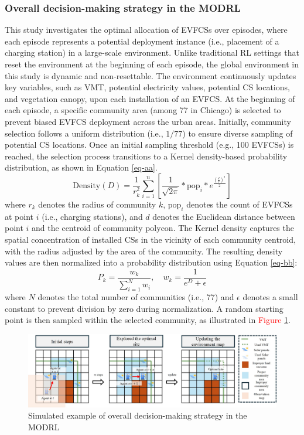 \documentclass[preprint,12pt]{elsarticle}
\begin{document}
\subsubsection{Overall decision-making strategy in the MODRL}
This study investigates the optimal allocation of EVFCSs over episodes, where each episode represents a potential deployment instance (i.e., placement of a charging station) in a large-scale environment. Unlike traditional RL settings that reset the environment at the beginning of each episode, the global environment in this study is dynamic and non-resettable. The environment continuously updates key variables, such as VMT, potential electricity values, potential CS locations, and vegetation canopy, upon each installation of an EVFCS. At the beginning of each episode, a specific community area (among 77 in Chicago) is selected to prevent biased EVFCS deployment across the urban areas. Initially, community selection follows a uniform distribution (i.e., $1/77$) to ensure diverse sampling of potential CS locations. Once an initial sampling threshold (e.g., 100 EVFCSs) is reached, the selection process transitions to a Kernel density-based probability distribution, as shown in Equation \eqref{eq-aa}.
\begin{equation} \label{eq-aa}
    \mathrm{Density}(D)=\frac{1}{r^2_k}\sum_{i=1}^{n}[\frac{1}{\sqrt{2\pi}}*\mathrm{pop}_i*e^{\frac{(\frac{d}{r})^2}{2}}]
\end{equation}
where $r_k$ denotes the radius of community $k$, $\mathrm{pop}_i$ denotes the count of EVFCSs at point $i$ (i.e., charging stations), and $d$ denotes the Euclidean distance between point $i$ and the centroid of community polycon. The Kernel density captures the spatial concentration of installed CSs in the vicinity of each community centroid, with the radius adjusted by the area of the community. The resulting density values are then normalized into a probability distribution using Equation \eqref{eq-bb}:
\begin{equation} \label{eq-bb}
    P_k=\frac{w_k}{\sum_{i=1}^{N}w_i}, \quad w_k=\frac{1} {e^{D}+\epsilon}
\end{equation}
where $N$ denotes the total number of communities (i.e., 77) and $\epsilon$ denotes a small constant to prevent division by zero during normalization. A random starting point is then sampled within the selected community, as illustrated in \textcolor{red}{Figure} \ref{fig:seofsm}.
\begin{figure}[h]
    \centering
    \includegraphics[width=0.85\linewidth]{paper/doc/result_figure/system_model_v3.jpg}
    \caption{Simulated example of overall decision-making strategy in the MODRL}
    \label{fig:seofsm}
\end{figure}
\end{document}
